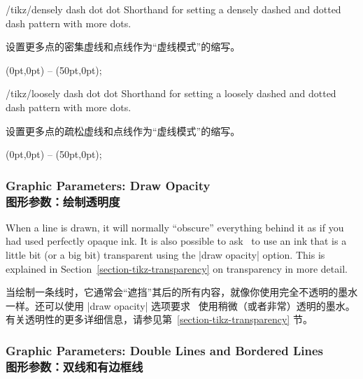 \begin{stylekey}{/tikz/densely dash dot dot}
    Shorthand for setting a densely dashed and dotted dash pattern with more dots.
    
    设置更多点的密集虚线和点线作为“虚线模式”的缩写。
%
\begin{codeexample}[]
\tikz {} (0pt,0pt) -- (50pt,0pt);
\end{codeexample}
\end{stylekey}

\begin{stylekey}{/tikz/loosely dash dot dot}
    Shorthand for setting a loosely dashed and dotted dash pattern with more dots.
    
    设置更多点的疏松虚线和点线作为“虚线模式”的缩写。
%
\begin{codeexample}[]
\tikz {} (0pt,0pt) -- (50pt,0pt);
\end{codeexample}
\end{stylekey}


\subsubsection{Graphic Parameters: Draw Opacity\\图形参数：绘制透明度}

When a line is drawn, it will normally ``obscure'' everything behind it as if
you had used perfectly opaque ink. It is also possible to ask \tikzname\ to use
an ink that is a little bit (or a big bit) transparent using the |draw opacity|
option. This is explained in Section~\ref{section-tikz-transparency} on
transparency in more detail.

当绘制一条线时，它通常会“遮挡”其后的所有内容，就像你使用完全不透明的墨水一样。还可以使用 |draw opacity| 选项要求 \tikzname\ 使用稍微（或者非常）透明的墨水。有关透明性的更多详细信息，请参见第~\ref{section-tikz-transparency} 节。


\subsubsection{Graphic Parameters: Double Lines and Bordered Lines\\图形参数：双线和有边框线}

